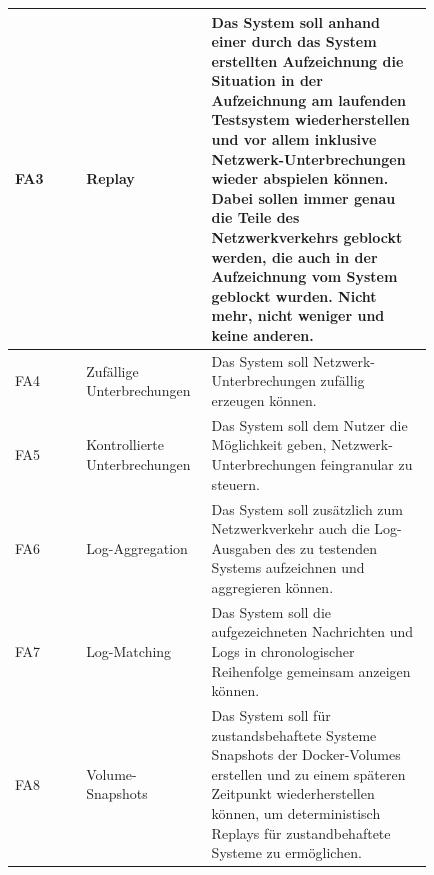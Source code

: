 \documentclass[12pt,a4paper]{report}
\begin{document}
\begin{longtable}[H]{|p{}|p{0.3\linewidth}|p{0.53\linewidth}|}
	FA3  & Replay                        & Das System soll anhand einer durch das System erstellten Aufzeichnung die Situation in der Aufzeichnung am laufenden Testsystem wiederherstellen und vor allem inklusive Netzwerk-Unterbrechungen wieder abspielen können. Dabei sollen immer genau die Teile des Netzwerkverkehrs geblockt werden, die auch in der Aufzeichnung vom System geblockt wurden. Nicht mehr, nicht weniger und keine anderen. \\ \hline
	FA4  & Zufällige Unterbrechungen     & Das System soll Netzwerk-Unterbrechungen zufällig erzeugen können.                                                                                                                                                                                                                                                                                                                                        \\ \hline
	FA5  & Kontrollierte Unterbrechungen & Das System soll dem Nutzer die Möglichkeit geben, Netzwerk-Unterbrechungen feingranular zu steuern.                                                                                                                                                                                                                                                                                                       \\ \hline
	FA6  & Log-Aggregation               & Das System soll zusätzlich zum Netzwerkverkehr auch die Log-Ausgaben des zu testenden Systems aufzeichnen und aggregieren können.                                                                                                                                                                                                                                                                         \\ \hline
	FA7  & Log-Matching                  & Das System soll die aufgezeichneten Nachrichten und Logs in chronologischer Reihenfolge gemeinsam anzeigen können.                                                                                                                                                                                                                                                                                        \\ \hline
	FA8  & Volume-Snapshots              & Das System soll für zustandsbehaftete Systeme Snapshots der Docker-Volumes erstellen und zu einem späteren Zeitpunkt wiederherstellen können, um deterministisch Replays für zustandbehaftete Systeme zu ermöglichen.                                                                                                                                                                                     \\ \hline

\end{longtable}
\end{document}

